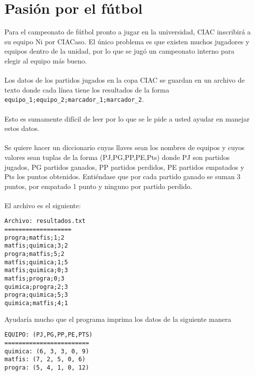 \section{Pasión por el fútbol}

Para el campeonato de fútbol pronto a jugar en la universidad, CIAC inscribirá a su equipo Ni por CIACaso. El único problema es que existen muchos jugadores y equipos dentro de la unidad, por lo que se jugó un campeonato interno para elegir al equipo más bueno.
 \\ \\
Los datos de los partidos jugados en la copa CIAC se guardan en un archivo de texto donde cada línea tiene los resultados de la forma \texttt{equipo\_1;equipo\_2;marcador\_1;marcador\_2}. 
\\ \\
Esto es sumamente difícil de leer por lo que se le pide a usted ayudar en manejar estos datos.
\\ \\
Se quiere hacer un diccionario cuyas llaves sean los nombres de equipos y cuyos valores sean tuplas de la forma (PJ,PG,PP,PE,Pts) donde PJ son partidos jugados, PG partidos ganados, PP partidos perdidos, PE partidos empatados y Pts los puntos obtenidos. Entiéndase que por cada partido ganado se suman 3 puntos, por empatado 1 punto y ninguno por partido perdido.
\\ \\
El archivo es el siguiente:

\begin{lstlisting}[style=consola]
Archivo: resultados.txt
===================
progra;matfis;1;2
matfis;quimica;3;2
progra;matfis;5;2
matfis;quimica;1;5
matfis;quimica;0;3
matfis;progra;0;3
quimica;progra;2;3
progra;quimica;5;3
quimica;matfis;4;1
\end{lstlisting}

Ayudaría mucho que el programa imprima los datos de la siguiente manera

\begin{lstlisting}[style=consola]
EQUIPO: (PJ,PG,PP,PE,PTS)
========================
quimica: (6, 3, 3, 0, 9)
matfis: (7, 2, 5, 0, 6)
progra: (5, 4, 1, 0, 12)
\end{lstlisting}
